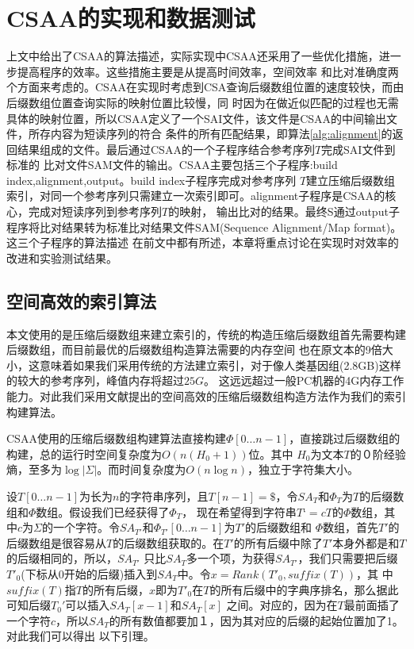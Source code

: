 \chapter{CSAA的实现和数据测试}

上文中给出了CSAA的算法描述，实际实现中CSAA还采用了一些优化措施，进一步提高程序的效率。这些措施主要是从提高时间效率，空间效率
和比对准确度两个方面来考虑的。CSAA在实现时考虑到CSA查询后缀数组位置的速度较快，而由后缀数组位置查询实际的映射位置比较慢，同
时因为在做近似匹配的过程也无需具体的映射位置，所以CSAA定义了一个SAI文件，该文件是CSAA的中间输出文件，所存内容为短读序列的符合
条件的所有匹配结果，即算法\ref{alg:alignment}的返回结果组成的文件。最后通过CSAA的一个子程序结合参考序列$T$完成SAI文件到标准的
比对文件SAM文件的输出。CSAA主要包括三个子程序:build index,alignment,output。build index子程序完成对参考序列
$T$建立压缩后缀数组索引，对同一个参考序列只需建立一次索引即可。alignment子程序是CSAA的核心，完成对短读序列到参考序列$T$的映射，
输出比对的结果。最终S通过output子程序将比对结果转为标准比对结果文件SAM(Sequence Alignment/Map format)。这三个子程序的算法描述
在前文中都有所述，本章将重点讨论在实现时对效率的改进和实验测试结果。

\section{空间高效的索引算法}
本文使用的是压缩后缀数组来建立索引的，传统的构造压缩后缀数组首先需要构建后缀数组，而目前最优的后缀数组构造算法需要的内存空间
也在原文本的9倍大小，这意味着如果我们采用传统的方法建立索引，对于像人类基因组(2.8GB)这样的较大的参考序列，峰值内存将超过$25G$。
这远远超过一般PC机器的4G内存工作能力。对此我们采用文献\cite{lam2002space}提出的空间高效的压缩后缀数组构造方法作为我们的索引
构建算法。

CSAA使用的压缩后缀数组构建算法直接构建$\Phi[0\ldots n-1]$，直接跳过后缀数组的构建，总的运行时空间复杂度为$O(n(H_0+1))$位。其中
$H_0$为文本$T$的０阶经验熵，至多为$\log|\Sigma|$。而时间复杂度为$O(n\log n)$，独立于字符集大小。

设$T[0\ldots n-1]$为长为$n$的字符串序列，且$T[n-1]=\$$，令$SA_T$和$\Phi_T$为$T$的后缀数组和$\Phi$数组。假设我们已经获得了$\Phi_T$，
现在希望得到字符串$T‘ = cT$的$\Phi$数组，其中$c$为$\Sigma$的一个字符。令$SA_{T'}$和$\Phi_{T'}[0\ldots n-1]$为$T'$的后缀数组和
$\Phi$数组，首先$T'$的后缀数组是很容易从$T$的后缀数组获取的。在$T'$的所有后缀中除了$T'$本身外都是和$T$的后缀相同的，所以，$SA_{T'}$
只比$SA_T$多一个项，为获得$SA_{T'}$，我们只需要把后缀$T' _0$(下标从0开始的后缀)插入到$SA_T$中。令$x=Rank(T'_0,suffix(T))$，其
中$suffix(T)$指$T$的所有后缀，$x$即为$T'_0$在$T$的所有后缀中的字典序排名，那么据此可知后缀$T_0'$可以插入$SA_T[x-1]$和$SA_T[x]$
之间。对应的，因为在$T$最前面插了一个字符$c$，所以$SA_T$的所有数值都要加１，因为其对应的后缀的起始位置加了1。对此我们可以得出
以下引理。

